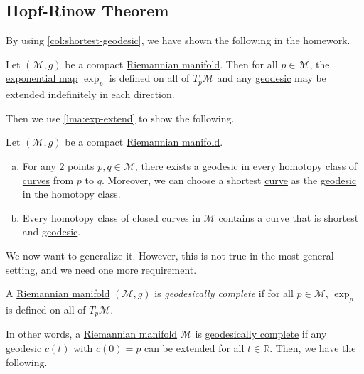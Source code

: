 \subsection{Hopf-Rinow Theorem}
By using \autoref{col:shortest-geodesic}, we have shown the following in the homework.

\begin{lemma}\label{lma:exp-extend}
	Let \((\mathcal{M} , g)\) be a compact \hyperref[def:Riemannian-manifold]{Riemannian manifold}. Then for all \(p\in \mathcal{M} \), the \hyperref[def:exponential-map]{exponential map} \(\exp _p\) is defined on all of \(T_p \mathcal{M} \) and any \hyperref[def:geodesic]{geodesic} may be extended indefinitely in each direction.
\end{lemma}

Then we use \autoref{lma:exp-extend} to show the following.

\begin{theorem}\label{thm:homotopy-geodesic}
	Let \((\mathcal{M} , g)\) be a compact \hyperref[def:Riemannian-manifold]{Riemannian manifold}.
	\begin{enumerate}[(a)]
		\item For any \(2\) points \(p, q\in \mathcal{M} \), there exists a \hyperref[def:geodesic]{geodesic} in every homotopy class of \hyperref[def:curve]{curves} from \(p\) to \(q\). Moreover, we can choose a shortest \hyperref[def:curve]{curve} as the \hyperref[def:geodesic]{geodesic} in the homotopy class.
		\item Every homotopy class of closed \hyperref[def:curve]{curves} in \(\mathcal{M} \) contains a \hyperref[def:curve]{curve} that is shortest and \hyperref[def:geodesic]{geodesic}.
	\end{enumerate}
\end{theorem}

We now want to generalize it. However, this is not true in the most general setting, and we need one more requirement.

\begin{definition}\label{def:geodesically-complete}
	A \hyperref[def:Riemannian-manifold]{Riemannian manifold} \((\mathcal{M} , g)\) is \emph{geodesically complete} if for all \(p\in \mathcal{M} \), \(\exp _p\) is defined on all of \(T_p \mathcal{M} \).
\end{definition}

In other words, a \hyperref[def:Riemannian-manifold]{Riemannian manifold} \(\mathcal{M} \) is \hyperref[def:geodesically-complete]{geodesically complete} if any \hyperref[def:geodesic]{geodesic} \(c(t)\) with \(c(0) = p\) can be extended for all \(t\in \mathbb{R} \). Then, we have the following.

